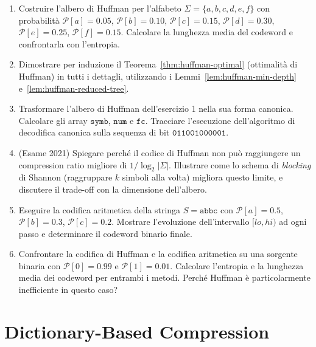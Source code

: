\documentclass[12pt, a4paper, oneside]{book}
\theoremstyle{plain}
\theoremstyle{definition}
\theoremstyle{remark}
\begin{document}
\begin{enumerate}
  \item Costruire l'albero di Huffman per l'alfabeto $\Sigma = \{a, b, c, d, e, f\}$ con probabilità $\mathcal{P}[a] = 0.05$, $\mathcal{P}[b] = 0.10$, $\mathcal{P}[c] = 0.15$, $\mathcal{P}[d] = 0.30$, $\mathcal{P}[e] = 0.25$, $\mathcal{P}[f] = 0.15$. Calcolare la lunghezza media del codeword e confrontarla con l'entropia.

  \item Dimostrare per induzione il Teorema~\ref{thm:huffman-optimal} (ottimalità di Huffman) in tutti i dettagli, utilizzando i Lemmi~\ref{lem:huffman-min-depth} e~\ref{lem:huffman-reduced-tree}.

  \item Trasformare l'albero di Huffman dell'esercizio 1 nella sua forma canonica. Calcolare gli array $\mathtt{symb}$, $\mathtt{num}$ e $\mathtt{fc}$. Tracciare l'esecuzione dell'algoritmo di decodifica canonica sulla sequenza di bit $\mathtt{011001000001}$.

  \item (Esame 2021) Spiegare perché il codice di Huffman non può raggiungere un compression ratio migliore di $1/\log_2 |\Sigma|$. Illustrare come lo schema di \emph{blocking} di Shannon (raggruppare $k$ simboli alla volta) migliora questo limite, e discutere il trade-off con la dimensione dell'albero.

  \item Eseguire la codifica aritmetica della stringa $S = \texttt{abbc}$ con $\mathcal{P}[a] = 0.5$, $\mathcal{P}[b] = 0.3$, $\mathcal{P}[c] = 0.2$. Mostrare l'evoluzione dell'intervallo $[lo, hi)$ ad ogni passo e determinare il codeword binario finale.

  \item Confrontare la codifica di Huffman e la codifica aritmetica su una sorgente binaria con $\mathcal{P}[0] = 0.99$ e $\mathcal{P}[1] = 0.01$. Calcolare l'entropia e la lunghezza media dei codeword per entrambi i metodi. Perché Huffman è particolarmente inefficiente in questo caso?
\end{enumerate}

\chapter{Dictionary-Based Compression}
\label{ch:dictionary-compression}
\end{document}
